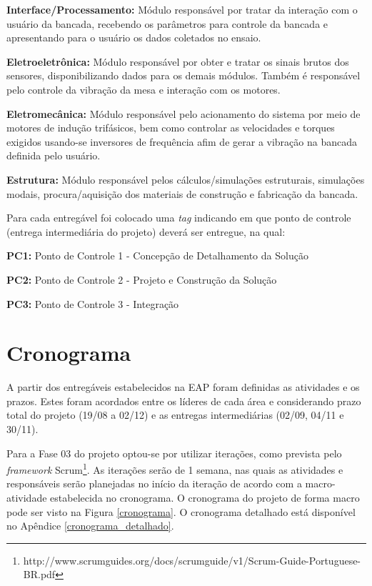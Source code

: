 \textbf{Interface/Processamento:} Módulo responsável por tratar da interação com o usuário da bancada, recebendo os parâmetros para controle da bancada e apresentando para o usuário os dados coletados no ensaio. 

\textbf{Eletroeletrônica:} Módulo responsável por obter e tratar os sinais brutos dos sensores, disponibilizando dados para os demais módulos. Também é responsável pelo controle da vibração da mesa e interação com os motores.  

\textbf{Eletromecânica:} Módulo responsável pelo acionamento do sistema por meio de motores de indução trifásicos, bem como controlar as velocidades e torques exigidos usando-se inversores de frequência afim de gerar a vibração na bancada definida pelo usuário.

\textbf{Estrutura:} Módulo responsável pelos cálculos/simulações estruturais, simulações modais, procura/aquisição dos materiais de construção e fabricação da bancada.

Para cada entregável foi colocado uma \textit{tag} indicando em que ponto de controle (entrega intermediária do projeto) deverá ser entregue, na qual: 

\indent \textbf{PC1:} Ponto de Controle 1 - Concepção de Detalhamento da Solução

\indent \textbf{PC2:} Ponto de Controle 2 - Projeto e Construção da Solução

\indent \textbf{PC3:} Ponto de Controle 3 - Integração
	
\section*{Cronograma}

A partir dos entregáveis estabelecidos na EAP foram definidas as atividades e os prazos. Estes foram acordados entre os líderes de cada área e considerando prazo total do projeto (19/08 a 02/12) e as entregas intermediárias (02/09, 04/11 e 30/11).

Para a Fase 03 do projeto optou-se por utilizar iterações, como prevista pelo \textit{framework} Scrum\footnote{http://www.scrumguides.org/docs/scrumguide/v1/Scrum-Guide-Portuguese-BR.pdf}. As iterações serão de 1 semana, nas quais as atividades e responsáveis serão planejadas no início da iteração de acordo com a macro-atividade estabelecida no cronograma. 
O cronograma do projeto de forma macro pode ser visto na Figura \ref{cronograma}. O cronograma detalhado está disponível no Apêndice \ref{cronograma_detalhado}.

